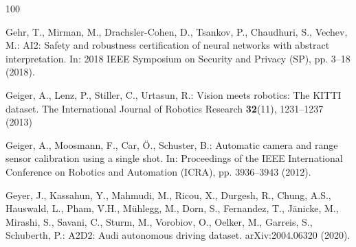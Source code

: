 \documentclass[graybox,envcountchap]{style/SNmono}
\begin{document}
\begin{thebibliography}{100}
{\par}

Gehr, T., Mirman, M., Drachsler-Cohen, D., Tsankov, P., Chaudhuri, S., Vechev,
  M.: {AI2}: Safety and robustness certification of neural networks with
  abstract interpretation.
\newblock In: 2018 IEEE Symposium on Security and Privacy (SP), pp. 3--18
  (2018).
\newblock {}


{\color{red} 
Geiger, A., Lenz, P., Stiller, C., Urtasun, R.: Vision meets robotics: The
  {KITTI} dataset.
\newblock The International Journal of Robotics Research \textbf{32}(11),
  1231--1237 (2013)

\par}

Geiger, A., Moosmann, F., Car, {\"O}., Schuster, B.: Automatic camera and range
  sensor calibration using a single shot.
\newblock In: Proceedings of the IEEE International Conference on Robotics and
  Automation (ICRA), pp. 3936--3943 (2012).
\newblock {}


{\color{red} 
Geyer, J., Kassahun, Y., Mahmudi, M., Ricou, X., Durgesh, R., Chung, A.S.,
  Hauswald, L., Pham, V.H., M{\"u}hlegg, M., Dorn, S., Fernandez, T.,
  J{\"a}nicke, M., Mirashi, S., Savani, C., Sturm, M., Vorobiov, O., Oelker,
  M., Garreis, S., Schuberth, P.: {A2D2}: {A}udi autonomous driving dataset.
\newblock arXiv:2004.06320 (2020).
\newblock {}

\par}
\end{thebibliography}
\end{document}
